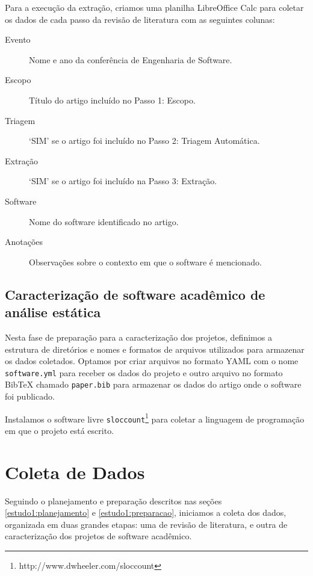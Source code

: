 \begin{description}
Para a execução da extração, criamos uma planilha LibreOffice Calc para coletar os dados de cada passo da
revisão de literatura com as seguintes colunas:

\begin{description}
  \item[Evento] Nome e ano da conferência de Engenharia de Software.
  \item[Escopo] Título do artigo incluído no Passo 1: Escopo.
  \item[Triagem] `SIM' se o artigo foi incluído no Passo 2: Triagem Automática.
  \item[Extração] `SIM' se o artigo foi incluído na Passo 3: Extração.
  \item[Software] Nome do software identificado no artigo.
  \item[Anotações] Observações sobre o contexto em que o software é mencionado.
\end{description}

\end{description}

\subsection{Caracterização de software acadêmico de análise estática}

Nesta fase de preparação para a caracterização dos projetos, definimos a
estrutura de diretórios e nomes e formatos de arquivos utilizados para
armazenar os dados coletados. Optamos por criar arquivos no formato YAML com o
nome \texttt{software.yml} para receber os dados do projeto e outro arquivo no
formato BibTeX chamado \texttt{paper.bib} para armazenar os dados do artigo
onde o software foi publicado.

Instalamos o software livre
\texttt{sloccount}\footnote{http://www.dwheeler.com/sloccount} para coletar a
linguagem de programação em que o projeto está escrito.


\section{Coleta de Dados} \label{estudo1:coleta} %

Seguindo o planejamento e preparação descritos nas seções
\ref{estudo1:planejamento} e \ref{estudo1:preparacao}, iniciamos a coleta dos
dados, organizada em duas grandes etapas: uma de revisão de literatura, e outra
de caracterização dos projetos de software acadêmico.

